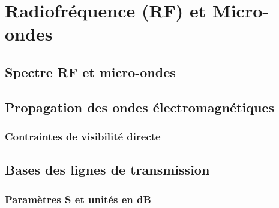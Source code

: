 \chapter{Radiofréquence (RF) et Micro-ondes} \label{chap:rf_microwaves}
\section{Spectre RF et micro-ondes} \label{subsec:rf_spectrum}
\section{Propagation des ondes électromagnétiques} \label{subsec:wave_propagation}
\subsection{Contraintes de visibilité directe}
\section{Bases des lignes de transmission} \label{subsec:transmission_lines}
\subsection{Paramètres S et unités en dB}
